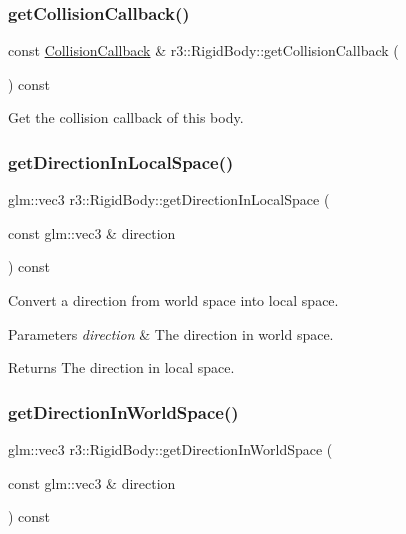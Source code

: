 \subsubsection{\texorpdfstring{get\+Collision\+Callback()}{getCollisionCallback()}}
{\footnotesize\ttfamily const \mbox{\hyperlink{classr3_1_1_collision_callback}{Collision\+Callback}} \& r3\+::\+Rigid\+Body\+::get\+Collision\+Callback (\begin{DoxyParamCaption}{ }\end{DoxyParamCaption}) const}



Get the collision callback of this body. 

\mbox{\label{classr3_1_1_rigid_body_a621796b0cd49499e10b158096ae5c938}} 
\subsubsection{\texorpdfstring{get\+Direction\+In\+Local\+Space()}{getDirectionInLocalSpace()}}
{\footnotesize\ttfamily glm\+::vec3 r3\+::\+Rigid\+Body\+::get\+Direction\+In\+Local\+Space (\begin{DoxyParamCaption}\item[{const glm\+::vec3 \&}]{direction }\end{DoxyParamCaption}) const}



Convert a direction from world space into local space. 


\begin{DoxyParams}{Parameters}
{\em direction} & The direction in world space. \\
\hline
\end{DoxyParams}
\begin{DoxyReturn}{Returns}
The direction in local space. 
\end{DoxyReturn}
\mbox{\label{classr3_1_1_rigid_body_aa51f55f7c344d1d7754b91b565cb6eac}} 
\subsubsection{\texorpdfstring{get\+Direction\+In\+World\+Space()}{getDirectionInWorldSpace()}}
{\footnotesize\ttfamily glm\+::vec3 r3\+::\+Rigid\+Body\+::get\+Direction\+In\+World\+Space (\begin{DoxyParamCaption}\item[{const glm\+::vec3 \&}]{direction }\end{DoxyParamCaption}) const}



